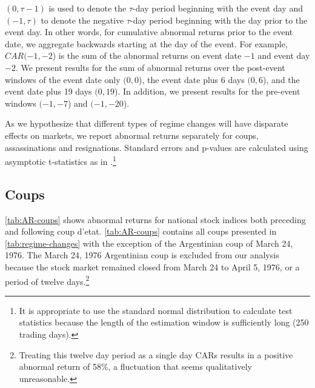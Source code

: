 \documentclass[12pt,final,fleqn]{article}
\theoremstyle{plain}
\begin{document}
$(0,\tau-1)$ is used to denote the $\tau$-day period beginning with the event day and $(-1,\tau)$ to denote the negative $\tau$-day period beginning with the day prior to the event day. In other words, for cumulative abnormal returns prior to the event date, we aggregate backwards starting at the day of the event. For example, $CAR(-1,-2$) is the sum of the abnormal returns on event date $-1$ and event day $-2$. We present results for the sum of abnormal returns over the post-event windows of the event date only $(0,0$), the event date plus 6 days $(0,6$), and the event date plus 19 days $(0,19$). In addition, we present results for the pre-event windows $(-1,-7$) and $(-1,-20$).

As we hypothesize that different types of regime changes will have disparate effects on markets, we report abnormal returns separately for coups, assassinations and resignations. Standard errors and p-values are calculated using asymptotic t-statistics as in \citet{mackinlay1997event}.\footnote{It is appropriate to use the standard normal distribution to calculate test statistics because the length of the estimation window is sufficiently long (250 trading days).} 

\subsection{Coups} \label{subsec: Coups}
\autoref{tab:AR-coups} shows abnormal returns for national stock indices both preceding and following coup d'etat. \autoref{tab:AR-coups} contains all coups presented in \autoref{tab:regime-changes} with the exception of the Argentinian coup of March 24, 1976. The March 24, 1976 Argentinian coup is excluded from our analysis because the stock market remained closed from March 24 to April 5, 1976, or a period of twelve days.\footnote{Treating this twelve day period as a single day CARs results in a positive abnormal return of 58\%, a fluctuation that seems qualitatively unreasonable.} 
\end{document}
